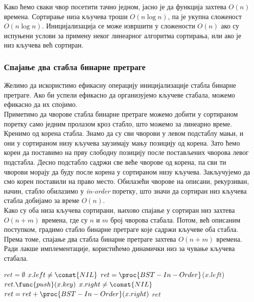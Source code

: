\documentclass[11pt, a4paper]{article}
\theoremstyle{remark}
\numberwithin{equation}{section}
\begin{document}
	\indent Како ћемо сваки чвор посетити тачно једном, јасно је да функција  захтева $O(n)$ времена. Сортирање низа кључева троши $O(n \log n)$, па је укупна сложеност $O(n \log n)$. Иницијализација се може извршити у сложености $O(n)$ ако су испуњени услови за примену неког линеарног алгоритма сортирања, или ако је низ кључева већ сортиран.
	
	\subsubsection{Спајање два стабла бинарне претраге}
	
	Желимо да искористимо ефикасну операцију иницијализације стабла бинарне претраге. Ако би успели ефикасно да организујемо кључеве стабала, можемо ефикасно да их спојимо. \\
	
	\indent Приметимо да чворове стабла бинарне претраге можемо добити у сортираном поретку само једним пролазом кроз стабло, што можемо за линеарно време. Кренимо од корена стабла. Знамо да су сви чворови у левом подстаблу мањи, и они у сортираном низу кључева заузимају мању позицију од корена. Зато ћемо корен да поставимо на прву слободну позицију после постављених чворова левог подстабла. Десно подстабло садржи све веће чворове од корена, па сви ти чворови морају да буду после корена у сортираном низу кључева. Закључујемо да смо корен поставили на право место. Обилазећи чворове на описани, рекурзиван, начин, стабло обилазимо у \textit{in-order} поретку, што значи да сортиран низ кључева стабла добијамо за време $O(n)$. \\
	\indent Како су оба низа кључева сортирани, њихово спајање у сортиран низ захтева $O(n+m)$ времена, где су $n$ и $m$ број чворова стабала. Потом, већ описаним поступком, градимо стабло бинарне претраге које садржи кључеве оба стабла. Према томе, спајање два стабла бинарне претраге захтева $O(n+m)$ времена. \\
	\indent Ради лакше имплементације, користићемо динамички низ за чување кључева стабала.
	
	\begin{codebox}
		\li $ret=\emptyset$
		\li \If $x.left \neq \const{NIL}$
		\li \Do $ret=\proc{BST-In-Order}$($x.left$)
		\End
		\li $ret.\func{push}(x.key)$
		\li \If $x.right \neq \const{NIL}$
		\li \Do $ret=ret+\proc{BST-In-Order}(x.right)$
		\End
		\li \Return $ret$
	\end{codebox}
	
\end{document}
